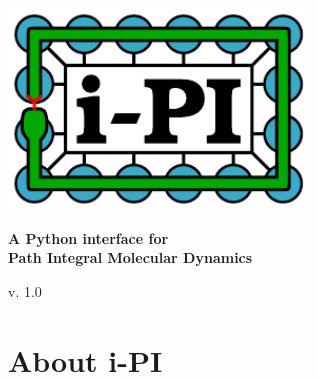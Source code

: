 \documentclass[11pt,english,fleqn]{report}
\begin{document}
\newcommand{\dd}{\; \mathrm{d}} 
\newcommand{\Tr}{\mathrm{Tr}} 
\newcommand{\bra}{< \! \!} 
\newcommand{\ket}{\! \! >} 
\newcommand{\betan}{\beta_N} 
\newcommand{\logn}{\mathrm{ln}} 
\newcommand{\expon}{\mathrm{exp}} 
\newcommand{\Imag}{\mathrm{Im}}
\newcommand{\ipi}{{i-PI}\xspace}
\newcommand{\DFT}{Quantum Espresso, CP2K, CPMD and FHI-AIMS }
\newcommand{\empirical}{LAMMPS}

\begin{titlepage} 

\begin{center}
\vspace*{2.5cm}

\par\end{center}

\begin{center}
\includegraphics[width=0.6\textwidth]{figures/ipi-logo.pdf}
\par\end{center}

\begin{center}
{\Large\bf A Python interface for \\Path Integral Molecular Dynamics}
\par\end{center}

\begin{center}
{\large v. 1.0}
\par\end{center}

\end{titlepage}


\tableofcontents{}


\newpage{}


\chapter{About \ipi}
\end{document}
